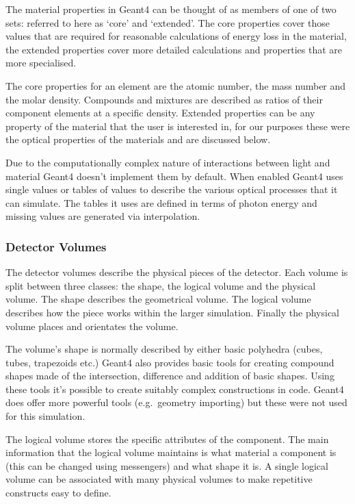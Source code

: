 The material properties in Geant4 can be thought of as members of one of two sets: referred to here as `core' and `extended'. The core properties cover those values that are required for reasonable calculations of energy loss in the material, the extended properties cover more detailed calculations and properties that are more specialised.

The core properties for an element are the atomic number, the mass number and the molar density. Compounds and mixtures are described as ratios of their component elements at a specific density. Extended properties can be any property of the material that the user is interested in, for our purposes these were the optical properties of the materials and are discussed below.

Due to the computationally complex nature of interactions between light and material Geant4 doesn't implement them by default. When enabled Geant4 uses single values or tables of values to describe the various optical processes that it can simulate. The tables it uses are defined in terms of photon energy and missing values are generated via interpolation. 

\subsubsection{Detector Volumes} %
\label{ssub:detector_volumes}

The detector volumes describe the physical pieces of the detector. Each volume is split between three classes: the shape, the logical volume and the physical volume. The shape describes the geometrical volume. The logical volume describes how the piece works within the larger simulation. Finally the physical volume places and orientates the volume. 

The volume's shape is normally described by either basic polyhedra (cubes, tubes, trapezoids etc.) Geant4 also provides basic tools for creating compound shapes made of the intersection, difference and addition of basic shapes. Using these tools it's possible to create suitably complex constructions in code. Geant4 does offer more powerful tools (e.g.\ geometry importing) but these were not used for this simulation.

The logical volume stores the specific attributes of the component. The main information that the logical volume maintains is what material a component is (this can be changed using messengers) and what shape it is. A single logical volume can be associated with many physical volumes to make repetitive constructs easy to define.

